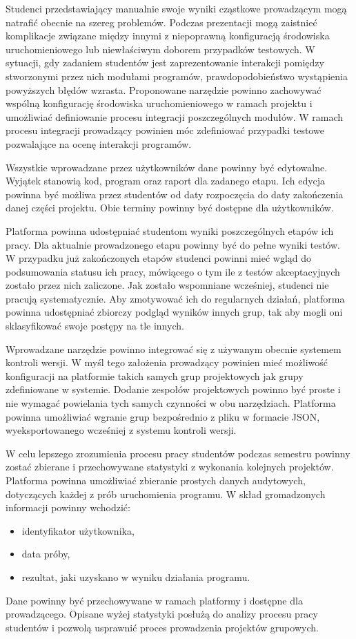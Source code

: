 Studenci przedstawiający manualnie swoje wyniki cząstkowe prowadzącym mogą natrafić obecnie na szereg problemów.
Podczas prezentacji mogą zaistnieć komplikacje związane między innymi z niepoprawną konfiguracją środowiska uruchomieniowego lub niewłaściwym doborem przypadków testowych.
W sytuacji, gdy zadaniem studentów jest zaprezentowanie interakcji pomiędzy stworzonymi
przez nich modułami programów, prawdopodobieństwo wystąpienia powyższych błędów
wzrasta.
Proponowane narzędzie powinno zachowywać wspólną konfigurację środowiska uruchomieniowego w ramach projektu i umożliwiać definiowanie procesu integracji poszczególnych modułów. 
W ramach procesu integracji prowadzący powinien móc zdefiniować przypadki testowe pozwalające na ocenę interakcji programów.

Wszystkie wprowadzane przez użytkowników dane powinny być edytowalne.
Wyjątek stanowią kod, program oraz raport dla zadanego etapu.
Ich edycja powinna być możliwa przez studentów od daty rozpoczęcia do daty zakończenia danej części projektu.
Obie terminy powinny być dostępne dla użytkowników.

Platforma powinna udostępniać studentom wyniki poszczególnych etapów ich pracy.
Dla aktualnie prowadzonego etapu powinny być do pełne wyniki testów.
W przypadku już zakończonych etapów studenci powinni mieć wgląd do podsumowania statusu ich pracy, mówiącego o tym ile z testów akceptacyjnych zostało przez nich zaliczone.
Jak zostało wspomniane wcześniej, studenci nie pracują systematycznie.
Aby zmotywować ich do regularnych działań, platforma powinna udostępniać zbiorczy podgląd wyników innych grup, tak aby mogli oni sklasyfikować swoje postępy na tle innych.

Wprowadzane narzędzie powinno integrować się z używanym obecnie systemem kontroli wersji.
W myśl tego założenia prowadzący powinien mieć możliwość konfiguracji na platformie takich samych grup projektowych jak grupy zdefiniowane w systemie.
Dodanie zespołów projektowych powinno być proste i nie wymagać powielania tych samych czynności w obu narzędziach.
Platforma powinna umożliwiać wgranie grup bezpośrednio z pliku w formacie JSON, wyeksportowanego wcześniej z systemu kontroli wersji.

W celu lepszego zrozumienia procesu pracy studentów podczas semestru powinny zostać zbierane i przechowywane statystyki z wykonania kolejnych projektów.
Platforma powinna umożliwiać zbieranie prostych danych audytowych, dotyczących każdej z prób uruchomienia programu.
W skład gromadzonych informacji powinny wchodzić:
\begin{itemize}
\item identyfikator użytkownika,
\item data próby,
\item rezultat, jaki uzyskano w wyniku działania programu.
\end{itemize}
Dane powinny być przechowywane w ramach platformy i dostępne dla prowadzącego.
Opisane wyżej statystyki posłużą do analizy procesu pracy studentów i pozwolą usprawnić proces prowadzenia projektów grupowych.

